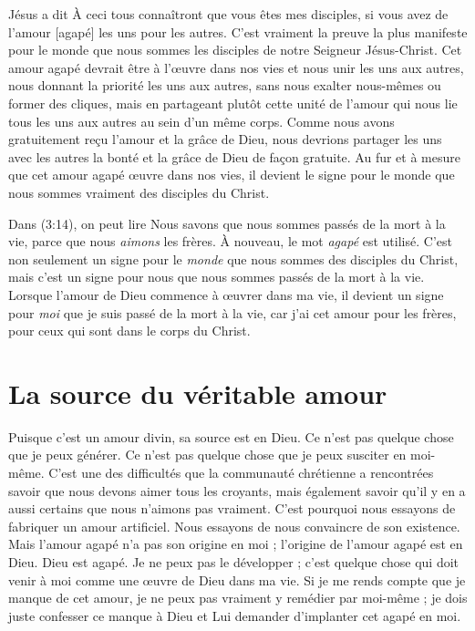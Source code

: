 Jésus a dit\frcolon{}
 \Og À ceci tous connaîtront que vous êtes mes disciples,
 si vous avez de l'amour [agapé] les uns pour les autres. \Fg{}
 C'est vraiment la preuve la plus manifeste pour le monde
 que nous sommes les disciples de notre Seigneur Jésus-Christ.
 Cet amour agapé devrait être à l'œuvre dans nos vies
 et nous unir les uns aux autres,
 nous donnant la priorité les uns aux autres,
 sans nous exalter nous-mêmes ou former des cliques,
 mais en partageant plutôt cette unité de l'amour qui
 nous lie tous les uns aux autres au sein d'un même corps.
 Comme nous avons gratuitement reçu l'amour et la grâce de Dieu,
 nous devrions partager les uns avec les autres la bonté
 et la grâce de Dieu de façon gratuite.
 Au fur et à mesure que cet amour agapé
 \oe{}uvre dans nos vies,
 il devient le signe pour le monde que nous sommes vraiment
 des disciples du Christ.

Dans (3:14), on peut lire\frcolon{}
 \Og Nous savons que nous sommes passés de la mort à la vie,
 parce que nous \emph{aimons} les frères. \Fg{}
 À nouveau, le mot \emph{agapé} est utilisé.
 C'est non seulement un signe pour le \emph{monde}
 que nous sommes des disciples du Christ, mais c'est un signe pour nous
 que nous sommes passés de la mort à la vie.
 Lorsque l'amour de Dieu commence à \oe{}uvrer dans ma vie,
 il devient un signe pour \emph{moi} que je suis passé de la mort à la vie,
 car j'ai cet amour pour les frères, pour ceux qui sont
 dans le corps du Christ.


\section{La source du v\'eritable amour}

Puisque c'est un amour divin, sa source est en Dieu.
 Ce n'est pas quelque chose que je peux générer.
 Ce n'est pas quelque chose que je peux susciter en moi-même.
 C'est une des difficultés que la communauté chrétienne a rencontrées\frcolon{}
 savoir que nous devons aimer tous les croyants, mais également savoir
 qu'il y en a aussi certains que nous n'aimons pas vraiment.
 C'est pourquoi nous essayons de fabriquer un amour artificiel.
 Nous essayons de nous convaincre de son existence.
 Mais l'amour agapé n'a pas son origine en moi ;
 l'origine de l'amour agapé est en Dieu. Dieu est agapé.
 Je ne peux pas le développer ; c'est quelque chose qui doit venir à moi
 comme une œuvre de Dieu dans ma vie.
 Si je me rends compte que je manque de cet amour, je ne peux pas vraiment
 y remédier par moi-même ; je dois juste confesser ce manque à Dieu
 et Lui demander d'implanter cet agapé en moi.

